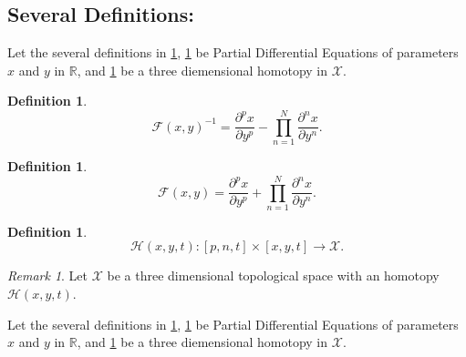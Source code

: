 \documentclass[10pt]{article}
\theoremstyle{plain}
\theoremstyle{definition}
\newtheorem{definition}[theorem]{Definition}
\theoremstyle{remark}
\newtheorem{remark}[theorem]{Remark}
\begin{document}
\subsection{Several Definitions:}

Let the several definitions in \ref{def:1}, \ref{def:2} be Partial Differential Equations of parameters $x$ and $y$ in $\mathbb{R}$, and \ref{def:3} be a three diemensional homotopy in $\mathcal{X}$.

\begin{definition}
\label{def:1}
\begin{equation}
	\mathcal{F}(x, y)^{-1} = \frac{\partial^p x}{ \partial y^p} - \prod_{n=1}^{N} \frac{\partial^n x}{ \partial y^n}. 
\end{equation}
\end{definition}

\begin{definition}
\label{def:2}
\begin{equation}
	\mathcal{F}(x, y) = \frac{\partial^p x}{ \partial y^p} + \prod_{n=1}^{N} \frac{\partial^n x}{ \partial y^n}. 
\end{equation}
\end{definition}

\begin{definition}
\label{def:3}
\begin{equation}
	\mathcal{H}(x, y, t) : [p, n, t] \times [x, y, t] \to \mathcal{X}.
\end{equation}
\end{definition}

\begin{remark}
\label{rem:3.1}
	Let $\mathcal{X}$ be a three dimensional topological space with an homotopy $\mathcal{H}(x, y, t)$.
\end{remark}

Let the several definitions in \ref{def:1}, \ref{def:2} be Partial Differential Equations of parameters $x$ and $y$ in $\mathbb{R}$, and \ref{def:3} be a three diemensional homotopy in $\mathcal{X}$.

\end{document}
